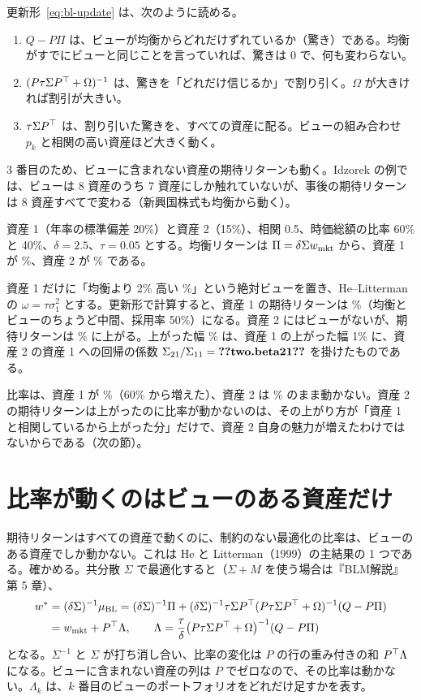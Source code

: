 更新形~\eqref{eq:bl-update} は、次のように読める。

\begin{enumerate}
\item $Q-P\Pi$ は、ビューが均衡からどれだけずれているか（驚き）である。均衡がすでにビューと同じことを言っていれば、驚きは 0 で、何も変わらない。
\item $(P\tau\Sigma P^{\top}+\Omega)^{-1}$ は、驚きを「どれだけ信じるか」で割り引く。$\Omega$ が大きければ割引が大きい。
\item $\tau\Sigma P^{\top}$ は、割り引いた驚きを、すべての資産に配る。ビューの組み合わせ $p_k$ と相関の高い資産ほど大きく動く。
\end{enumerate}

3 番目のため、ビューに含まれない資産の期待リターンも動く。Idzorek の例では、ビューは 8 資産のうち 7 資産にしか触れていないが、事後の期待リターンは 8 資産すべてで変わる（新興国株式も均衡から動く）。

\begin{exbox}[2 資産で手計算する]
資産 1（年率の標準偏差 20\%）と資産 2（15\%）、相関 0.5、時価総額の比率 60\% と 40\%、$\delta=2.5$、$\tau=0.05$ とする。均衡リターンは $\Pi=\delta\Sigma w_{\mathrm{mkt}}$ から、資産 1 が \%、資産 2 が \% である。

資産 1 だけに「均衡より 2\% 高い \%」という絶対ビューを置き、He--Litterman の $\omega=\tau\sigma_1^2$ とする。更新形で計算すると、資産 1 の期待リターンは \%（均衡とビューのちょうど中間、採用率 50\%）になる。資産 2 にはビューがないが、期待リターンは \% に上がる。上がった幅 \% は、資産 1 の上がった幅 1\% に、資産 2 の資産 1 への回帰の係数 $\Sigma_{21}/\Sigma_{11}=\V{two.beta21}$ を掛けたものである。

比率は、資産 1 が \%（60\% から増えた）、資産 2 は \% のまま動かない。資産 2 の期待リターンは上がったのに比率が動かないのは、その上がり方が「資産 1 と相関しているから上がった分」だけで、資産 2 自身の魅力が増えたわけではないからである（次の節）。
\end{exbox}

\section{比率が動くのはビューのある資産だけ}\label{sec:hl-property}

期待リターンはすべての資産で動くのに、制約のない最適化の比率は、ビューのある資産でしか動かない。これは He と Litterman（1999）の主結果の 1 つである。確かめる。共分散 $\Sigma$ で最適化すると（$\Sigma+M$ を使う場合は『BLM解説』第 5 章）、
\begin{align}
w^*&=(\delta\Sigma)^{-1}\mu_{\mathrm{BL}}
=(\delta\Sigma)^{-1}\Pi+(\delta\Sigma)^{-1}\tau\Sigma P^{\top}(P\tau\Sigma P^{\top}+\Omega)^{-1}(Q-P\Pi)\notag\\
&=w_{\mathrm{mkt}}+P^{\top}\Lambda,\qquad \Lambda=\frac{\tau}{\delta}\bigl(P\tau\Sigma P^{\top}+\Omega\bigr)^{-1}(Q-P\Pi)
\label{eq:hl-weights}
\end{align}
となる。$\Sigma^{-1}$ と $\Sigma$ が打ち消し合い、比率の変化は $P$ の行の重み付きの和 $P^{\top}\Lambda$ になる。ビューに含まれない資産の列は $P$ でゼロなので、その比率は動かない。$\Lambda_k$ は、$k$ 番目のビューのポートフォリオをどれだけ足すかを表す。


